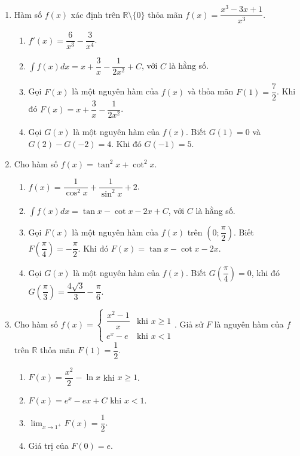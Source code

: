 \documentclass[12pt]{article}
\begin{document}
\begin{enumerate}[label=\textbf{Câu \arabic*.}, start=1]
		\item Hàm số $f(x)$ xác định trên $\mathbb{R} \setminus \{0\}$ thỏa mãn $f(x) = \dfrac{x^3 - 3x + 1}{x^3}$.
		\begin{enumerate}[label=\alph*)]
			\item $f'(x) = \dfrac{6}{x^3} - \dfrac{3}{x^4}$.
			\item $\displaystyle \int f(x) dx = x + \dfrac{3}{x} - \dfrac{1}{2x^2} + C$, với $C$ là hằng số.
			\item Gọi $F(x)$ là một nguyên hàm của $f(x)$ và thỏa mãn $F(1) = \dfrac{7}{2}$. Khi đó $F(x) = x + \dfrac{3}{x} - \dfrac{1}{2x^2}$.
			\item Gọi $G(x)$ là một nguyên hàm của $f(x)$. Biết $G(1) = 0$ và $G(2) - G(-2) = 4$. Khi đó $G(-1) = 5$.
		\end{enumerate}
		
		\item Cho hàm số $f(x) = \tan^2 x + \cot^2 x$.
		\begin{enumerate}[label=\alph*)]
			\item $f(x) = \dfrac{1}{\cos^2 x} + \dfrac{1}{\sin^2 x} + 2$.
			\item $\displaystyle \int f(x) dx = \tan x - \cot x - 2x + C$, với $C$ là hằng số.
			\item Gọi $F(x)$ là một nguyên hàm của $f(x)$ trên $\left(0; \dfrac{\pi}{2}\right)$. Biết $F\left(\dfrac{\pi}{4}\right) = -\dfrac{\pi}{2}$. Khi đó $F(x) = \tan x - \cot x - 2x$.
			\item Gọi $G(x)$ là một nguyên hàm của $f(x)$. Biết $G\left(\dfrac{\pi}{4}\right) = 0$, khi đó $G\left(\dfrac{\pi}{3}\right) = \dfrac{4\sqrt{3}}{3} - \dfrac{\pi}{6}$.
		\end{enumerate}
		
		\item Cho hàm số $f(x) = \begin{cases} \dfrac{x^2 - 1}{x} & \text{khi } x \ge 1 \\ e^x - e & \text{khi } x < 1 \end{cases}$. Giả sử $F$ là nguyên hàm của $f$ trên $\mathbb{R}$ thỏa mãn $F(1) = \dfrac{1}{2}$.
		\begin{enumerate}[label=\alph*)]
			\item $F(x) = \dfrac{x^2}{2} - \ln x$ khi $x \ge 1$.
			\item $F(x) = e^x - ex + C$ khi $x < 1$.
			\item $\lim_{x \to 1^+} F(x) = \dfrac{1}{2}$.
			\item Giá trị của $F(0) = e$.
		\end{enumerate}
		

\end{enumerate}
\end{document}
